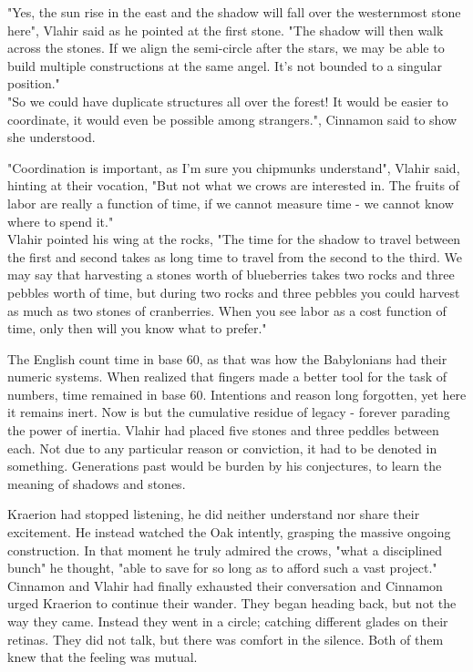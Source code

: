 \documentclass[smalldemyvopaper,11pt,twoside,onecolumn,openright,extrafontsizes]{memoir}
\begin{document}
"Yes, the sun rise in the east and the shadow will fall over the westernmost stone here", Vlahir said as he pointed at the first stone. "The shadow will then walk across the stones. If we align the semi-circle after the stars, we may be able to build multiple constructions at the same angel. It's not bounded to a singular position."\\

"So we could have duplicate structures all over the forest! It would be easier to coordinate, it would even be possible among strangers.", Cinnamon said to show she understood. 

"Coordination is important, as I'm sure you chipmunks understand", Vlahir said, hinting at their vocation, "But not what we crows are interested in. The fruits of labor are really a function of time, if we cannot measure time - we cannot know where to spend it." \\ 

Vlahir pointed his wing at the rocks, "The time for the shadow to travel between the first and second takes as long time to travel from the second to the third. We may say that harvesting a stones worth of blueberries takes two rocks and three pebbles worth of time, but during two rocks and three pebbles you could harvest as much as two stones of cranberries. When you see labor as a cost function of time, only then will you know what to prefer." %

The English count time in base 60, as that was how the Babylonians had their numeric systems. When realized that fingers made a better tool for the task of numbers, time remained in base 60. Intentions and reason long forgotten, yet here it remains inert. Now is but the cumulative residue of legacy - forever parading the power of inertia. Vlahir had placed five stones and three peddles between each. Not due to any particular reason or conviction, it had to be denoted in something. Generations past would be burden by his conjectures, to learn the meaning of shadows and stones. 

Kraerion had stopped listening, he did neither understand nor share their excitement. He instead watched the Oak intently, grasping the massive ongoing construction. In that moment he truly admired the crows, "what a disciplined bunch" he thought, "able to save for so long as to afford such a vast project." \\

Cinnamon and Vlahir had finally exhausted their conversation and Cinnamon urged Kraerion to continue their wander. They began heading back, but not the way they came. Instead they went in a circle; catching different glades on their retinas. They did not talk, but there was comfort in the silence. Both of them knew that the feeling was mutual. \\
\end{document}
